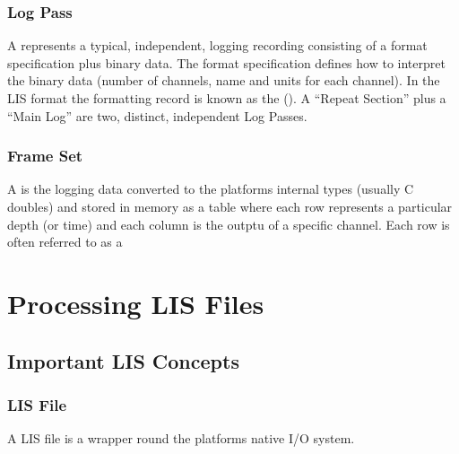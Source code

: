\documentclass[letterpaper,10pt,english]{sphinxmanual}
\begin{document}
\subsubsection{Log Pass}
\label{\detokenize{usage:log-pass}}
A {\hyperref[\detokenize{glossary:term-log-pass}]{}} represents a typical, independent, logging recording consisting of a format specification plus binary data. The format specification defines how to interpret the binary data (number of channels, name and units for each channel). In the LIS format the formatting record is known as the {\hyperref[\detokenize{glossary:term-data-format-specification-record}]{}} ({\hyperref[\detokenize{glossary:term-dfsr}]{}}). A “Repeat Section” plus a “Main Log” are two, distinct, independent Log Passes.


\subsubsection{Frame Set}
\label{\detokenize{usage:frame-set}}
A {\hyperref[\detokenize{glossary:term-frame-set}]{}} is the logging data converted to the platforms internal types (usually C doubles) and stored in memory as a table where each row represents a particular depth (or time) and each column is the outptu of a specific channel. Each row is often referred to as a {\hyperref[\detokenize{glossary:term-frame}]{}}


\section{Processing LIS Files}
\label{\detokenize{usage:processing-lis-files}}

\subsection{Important LIS Concepts}
\label{\detokenize{usage:important-lis-concepts}}

\subsubsection{LIS File}
\label{\detokenize{usage:lis-file}}
A LIS file is a wrapper round the platforms native I/O system.
\end{document}
